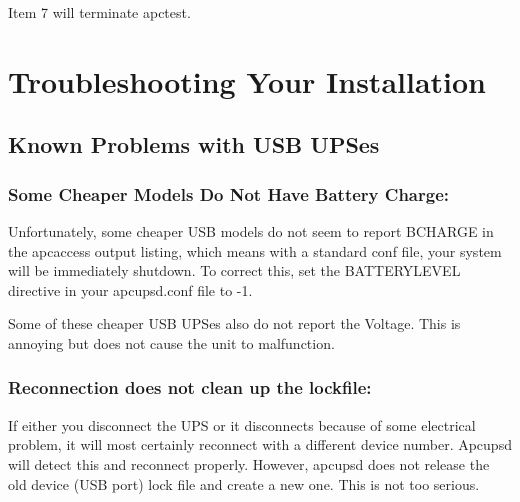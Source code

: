 {{{{Item 7 will terminate apctest. 

\label{Troubleshooting-Your-Installation}

\section*{Troubleshooting Your Installation}

\label{index-Troubleshooting-_0028see-problems_0029-101}
\label{index-Problems-102}

\label{Known-Problems-with-USB-UPSes}

\subsection*{Known Problems with USB UPSes}

\label{index-Problems_002c-USB-103}

\label{Some-Cheaper-Models-Do-Not-Have-Battery-Charge}

\subsubsection*{Some Cheaper Models Do Not Have Battery Charge:}

\label{index-Problems_002c-no-Battery-charge-104}
Unfortunately, some cheaper USB models do not seem to report BCHARGE in the
apcaccess output listing, which means with a standard conf file, your system
will be immediately shutdown. To correct this, set the BATTERYLEVEL directive
in your apcupsd.conf file to -1.  

Some of these cheaper USB UPSes also do not report the Voltage. This is
annoying but does not cause the unit to malfunction. 

\label{Reconnection-does-not-clean-up-the-lockfile}

\subsubsection*{Reconnection does not clean up the lockfile:}

\label{index-Problems_002c-lock-file-not-cleaned-up-105}
If either you disconnect the UPS or it disconnects because of some electrical
problem, it will most certainly reconnect with a different device number.
Apcupsd will detect this and reconnect properly. However, apcupsd does not
release the old device (USB port) lock file and create a new one. This is not
too serious. 

}}}}
